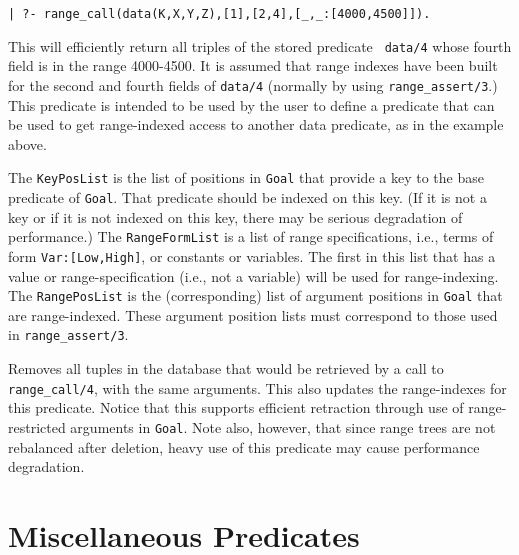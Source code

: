\begin{description}
\begin{verbatim}
| ?- range_call(data(K,X,Y,Z),[1],[2,4],[_,_:[4000,4500]]).
\end{verbatim}

This will efficiently return all triples of the stored predicate {\tt
  data/4} whose fourth field is in the range 4000-4500.  It is assumed
that range indexes have been built for the second and fourth fields of
{\tt data/4} (normally by using {\tt range\_assert/3}.)  This
predicate is intended to be used by the user to define a predicate
that can be used to get range-indexed access to another data
predicate, as in the example above.

The {\tt KeyPosList} is the list of positions in {\tt Goal} that
provide a key to the base predicate of {\tt Goal}.  That predicate
should be indexed on this key.  (If it is not a key or if it is not
indexed on this key, there may be serious degradation of performance.)
The {\tt RangeFormList} is a list of range specifications, i.e., terms
of form {\tt Var:[Low,High]}, or constants or variables.  The first in
this list that has a value or range-specification (i.e., not a
variable) will be used for range-indexing.  The {\tt RangePosList} is
the (corresponding) list of argument positions in {\tt Goal} that are
range-indexed.  These argument position lists must correspond to those
used in {\tt range\_assert/3}. 

%
Removes all tuples in the database that would be retrieved by a call
to {\tt range\_call/4}, with the same arguments.  This also updates
the range-indexes for this predicate.  Notice that this supports
efficient retraction through use of range-restricted arguments in
{\tt Goal}.  Note also, however, that since range trees are not
rebalanced after deletion, heavy use of this predicate may cause
performance degradation.  

\end{description}


\section{Miscellaneous Predicates}

